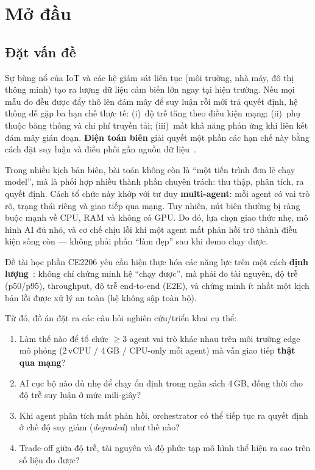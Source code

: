\documentclass[12pt,a4paper,oneside]{report}
\begin{document}
\clearpage
{}

\chapter{Mở đầu}

\section{Đặt vấn đề}

Sự bùng nổ của IoT và các hệ giám sát liên tục (môi trường, nhà máy, đô thị thông minh) tạo ra lượng dữ liệu cảm biến lớn ngay tại hiện trường. Nếu mọi mẫu đo đều được đẩy thô lên đám mây để suy luận rồi mới trả quyết định, hệ thống dễ gặp ba hạn chế thực tế: (i)~độ trễ tăng theo điều kiện mạng; (ii)~phụ thuộc băng thông và chi phí truyền tải; (iii)~mất khả năng phản ứng khi liên kết đám mây gián đoạn. \textbf{Điện toán biên} giải quyết một phần các hạn chế này bằng cách đặt suy luận và điều phối gần nguồn dữ liệu~\cite{shi2016edge}.

Trong nhiều kịch bản biên, bài toán không còn là ``một tiến trình đơn lẻ chạy model'', mà là phối hợp nhiều thành phần chuyên trách: thu thập, phân tích, ra quyết định. Cách tổ chức này khớp với tư duy \textbf{multi-agent}: mỗi agent có vai trò rõ, trạng thái riêng và giao tiếp qua mạng. Tuy nhiên, nút biên thường bị ràng buộc mạnh về CPU, RAM và không có GPU. Do đó, lựa chọn giao thức nhẹ, mô hình AI đủ nhỏ, và cơ chế chịu lỗi khi một agent mất phản hồi trở thành điều kiện sống còn --- không phải phần ``làm đẹp'' sau khi demo chạy được.

Đề tài học phần CE2206 yêu cầu hiện thực hóa các năng lực trên một cách \textbf{định lượng}~\cite{ce2206-de}: không chỉ chứng minh hệ ``chạy được'', mà phải đo tài nguyên, độ trễ (p50/p95), throughput, độ trễ end-to-end (E2E), và chứng minh ít nhất một kịch bản lỗi được xử lý an toàn (hệ không sập toàn bộ).

Từ đó, đồ án đặt ra các câu hỏi nghiên cứu/triển khai cụ thể:
\begin{enumerate}
  \item Làm thế nào để tổ chức $\geq 3$ agent vai trò khác nhau trên môi trường edge mô phỏng (2\,vCPU / 4\,GB / CPU-only mỗi agent) mà vẫn giao tiếp \textbf{thật qua mạng}?
  \item AI cục bộ nào đủ nhẹ để chạy ổn định trong ngân sách 4\,GB, đồng thời cho độ trễ suy luận ở mức mili-giây?
  \item Khi agent phân tích mất phản hồi, orchestrator có thể tiếp tục ra quyết định ở chế độ suy giảm (\textit{degraded}) như thế nào?
  \item Trade-off giữa độ trễ, tài nguyên và độ phức tạp mô hình thể hiện ra sao trên số liệu đo được?
\end{enumerate}
\end{document}
